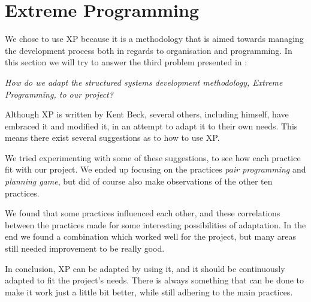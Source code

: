 \section{Extreme Programming}
We chose to use XP because it is a methodology that is aimed towards managing the development process both in regards to organisation and programming. 
In this section we will try to answer the third problem presented in :
\begin{center}
	\textit{How do we adapt the structured systems development methodology, Extreme Programming, to our project?}
\end{center}

\noindent Although XP is written by Kent Beck, several others, including himself, have embraced it and modified it, in an attempt to adapt it to their own needs.
This means there exist several suggestions as to how to use XP.

We tried experimenting with some of these suggestions, to see how each practice fit with our project.
We ended up focusing on the practices \textit{pair programming} and \textit{planning game}, but did of course also make observations of the other ten practices.

We found that some practices influenced each other, and these correlations between the practices made for some interesting possibilities of adaptation.
In the end we found a combination which worked well for the project, but many areas still needed improvement to be really good.

In conclusion, XP can be adapted by using it, and it should be continuously adapted to fit the project's needs. There is always something that can be done to make it work just a little bit better, while still adhering to the main practices.
